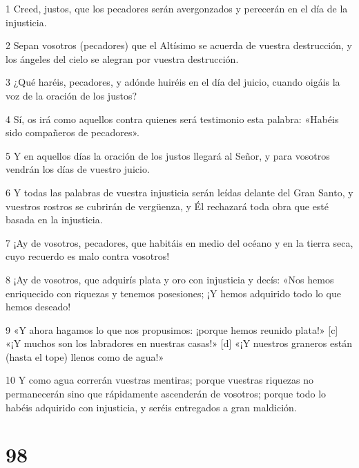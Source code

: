 \par 1 Creed, justos, que los pecadores serán avergonzados y perecerán en el día de la injusticia.
\par 2 Sepan vosotros (pecadores) que el Altísimo se acuerda de vuestra destrucción, y los ángeles del cielo se alegran por vuestra destrucción.
\par 3 ¿Qué haréis, pecadores, y adónde huiréis en el día del juicio, cuando oigáis la voz de la oración de los justos?
\par 4 Sí, os irá como aquellos contra quienes será testimonio esta palabra: «Habéis sido compañeros de pecadores».
\par 5 Y en aquellos días la oración de los justos llegará al Señor, y para vosotros vendrán los días de vuestro juicio.
\par 6 Y todas las palabras de vuestra injusticia serán leídas delante del Gran Santo, y vuestros rostros se cubrirán de vergüenza, y Él rechazará toda obra que esté basada en la injusticia.
\par 7 ¡Ay de vosotros, pecadores, que habitáis en medio del océano y en la tierra seca, cuyo recuerdo es malo contra vosotros!
\par 8 ¡Ay de vosotros, que adquirís plata y oro con injusticia y decís: «Nos hemos enriquecido con riquezas y tenemos posesiones; ¡Y hemos adquirido todo lo que hemos deseado!
\par 9 «Y ahora hagamos lo que nos propusimos: ¡porque hemos reunido plata!» [c] «¡Y muchos son los labradores en nuestras casas!» [d] «¡Y nuestros graneros están (hasta el tope) llenos como de agua!»
\par 10 Y como agua correrán vuestras mentiras; porque vuestras riquezas no permanecerán sino que rápidamente ascenderán de vosotros; porque todo lo habéis adquirido con injusticia, y seréis entregados a gran maldición.

\chapter{98}

